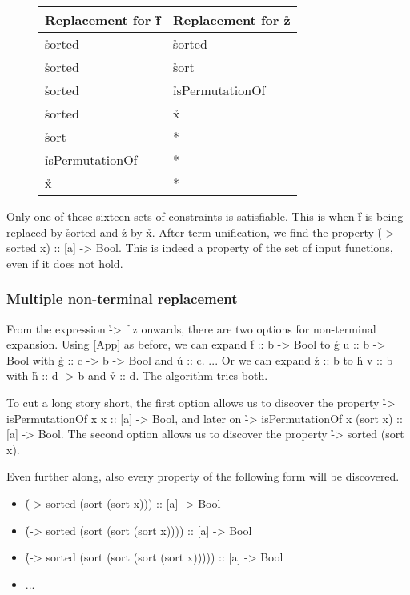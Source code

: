 \documentclass[a4paper, 11pt, onepage]{article}
\begin{document}
\begin{figure}[H]
  \centering
  \begin{tabular}{|l|l|}
    \hline
    Replacement for \h{f} & Replacement for \h{z} \\
    \hline
    \hline
    \h{sorted}            & \h{sorted}          \\
    \hline
    \h{sorted}            & \h{sort}            \\
    \hline
    \h{sorted}            & \h{isPermutationOf} \\
    \hline
    \h{sorted}            & \h{x}               \\
    \hline
    \h{sort}              & *                   \\
    \hline
    \h{isPermutationOf}   & *                   \\
    \hline
    \h{x}                 & *                   \\
    \hline
  \end{tabular}
\end{figure}

Only one of these sixteen sets of constraints is satisfiable.
This is when \h{f} is being replaced by \h{sorted} and \h{z} by \h{x}.
After term unification, we find the property \h{(\x -> sorted x) :: [a] -> Bool}.
This is indeed a property of the set of input functions, even if it does not hold.


\subsubsection{Multiple non-terminal replacement}

From the expression \h{\x -> f z} onwards, there are two options for non-terminal expansion.
Using [App] as before, we can expand \h{f :: b -> Bool} to \h{g u :: b -> Bool} with \h{g :: c -> b -> Bool} and \h{u :: c}.
... Or we can expand \h{z :: b} to \h{h v :: b} with \h{h :: d -> b} and \h{v :: d}.
The algorithm tries both.

To cut a long story short, the first option allows us to discover the property \h{\x -> isPermutationOf x x :: [a] -> Bool}, and later on \h{\x -> isPermutationOf x (sort x) :: [a] -> Bool}.
The second option allows us to discover the property \h{\x -> sorted (sort x)}.

Even further along, also every property of the following form will be discovered.

\begin{itemize}
  \item \h{(\x -> sorted (sort (sort x))) :: [a] -> Bool}
  \item \h{(\x -> sorted (sort (sort (sort x)))) :: [a] -> Bool}
  \item \h{(\x -> sorted (sort (sort (sort (sort x))))) :: [a] -> Bool}
  \item ...
\end{itemize}
\end{document}
